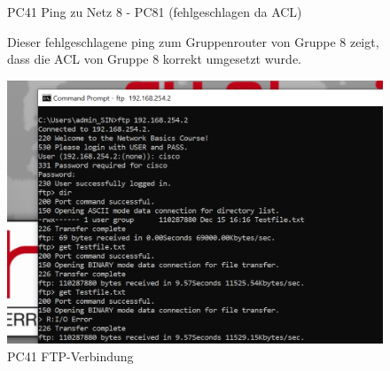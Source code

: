 \documentclass{article}
\begin{document}
\begin{figure}[!htp]
\begin{minipage}[b]{0.25\textwidth}
    \caption{PC41 Ping zu Netz 8 - PC81 (fehlgeschlagen da ACL)}
    Dieser fehlgeschlagene ping zum Gruppenrouter von Gruppe 8 zeigt, dass die ACL von Gruppe 8 korrekt umgesetzt wurde.\\
  \end{minipage}
  \hspace{0.8cm}
  \begin{minipage}[b]{0.25\textwidth}
    \includegraphics[width=\textwidth]{Arbeitsergebnisse/PC41/pc41_ftp.png}
    \caption{PC41 FTP-Verbindung}
  \end{minipage}
\end{figure}
\end{document}
